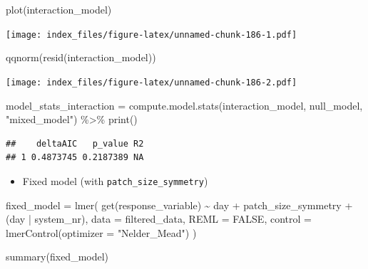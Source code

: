 \documentclass[
]{article}
\newenvironment{Shaded}{\begin{snugshade}}{\end{snugshade}}
\newcommand{\AttributeTok}[1]{\textcolor[rgb]{0.77,0.63,0.00}{#1}}
\newcommand{\ConstantTok}[1]{\textcolor[rgb]{0.00,0.00,0.00}{#1}}
\newcommand{\FunctionTok}[1]{\textcolor[rgb]{0.00,0.00,0.00}{#1}}
\newcommand{\NormalTok}[1]{#1}
\newcommand{\OtherTok}[1]{\textcolor[rgb]{0.56,0.35,0.01}{#1}}
\newcommand{\SpecialCharTok}[1]{\textcolor[rgb]{0.00,0.00,0.00}{#1}}
\newcommand{\StringTok}[1]{\textcolor[rgb]{0.31,0.60,0.02}{#1}}
\providecommand{\tightlist}{%
  \setlength{\itemsep}{0pt}\setlength{\parskip}{0pt}}
\begin{document}
\begin{Shaded}
\begin{Highlighting}[]
\FunctionTok{plot}\NormalTok{(interaction\_model)}
\end{Highlighting}
\end{Shaded}

\texttt{[image: index\_files/figure-latex/unnamed-chunk-186-1.pdf]}

\begin{Shaded}
\begin{Highlighting}[]
\FunctionTok{qqnorm}\NormalTok{(}\FunctionTok{resid}\NormalTok{(interaction\_model))}
\end{Highlighting}
\end{Shaded}

\texttt{[image: index\_files/figure-latex/unnamed-chunk-186-2.pdf]}

\begin{Shaded}
\begin{Highlighting}[]
\NormalTok{model\_stats\_interaction }\OtherTok{=} \FunctionTok{compute.model.stats}\NormalTok{(interaction\_model,}
\NormalTok{                                              null\_model,}
                                              \StringTok{"mixed\_model"}\NormalTok{) }\SpecialCharTok{\%\textgreater{}\%}
  \FunctionTok{print}\NormalTok{()}
\end{Highlighting}
\end{Shaded}

\begin{verbatim}
##    deltaAIC   p_value R2
## 1 0.4873745 0.2187389 NA
\end{verbatim}

\begin{itemize}
\tightlist
\item
  Fixed model (with \texttt{patch\_size\_symmetry})
\end{itemize}

\begin{Shaded}
\begin{Highlighting}[]
\NormalTok{fixed\_model }\OtherTok{=} \FunctionTok{lmer}\NormalTok{(}
  \FunctionTok{get}\NormalTok{(response\_variable) }\SpecialCharTok{\textasciitilde{}}
\NormalTok{    day }\SpecialCharTok{+} 
\NormalTok{    patch\_size\_symmetry }\SpecialCharTok{+} 
\NormalTok{    (day }\SpecialCharTok{|}\NormalTok{ system\_nr), }
  \AttributeTok{data =}\NormalTok{ filtered\_data,}
  \AttributeTok{REML =} \ConstantTok{FALSE}\NormalTok{,}
  \AttributeTok{control =} \FunctionTok{lmerControl}\NormalTok{(}\AttributeTok{optimizer =} \StringTok{"Nelder\_Mead"}\NormalTok{)}
\NormalTok{)}

\FunctionTok{summary}\NormalTok{(fixed\_model)}
\end{Highlighting}
\end{Shaded}
\end{document}
